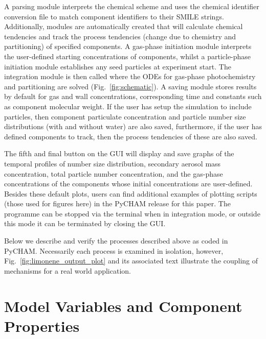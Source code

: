 \documentclass[gmd, manuscript]{copernicus}
\begin{document}
A parsing module interprets the chemical scheme and uses the chemical identifier conversion file to match component identifiers to their SMILE strings.  Additionally, modules are automatically created that will calculate chemical tendencies and track the process tendencies (change due to chemistry and partitioning) of specified components.  A gas-phase initiation module interprets the user-defined starting concentrations of components, whilst a particle-phase initiation module establishes any seed particles at experiment start.  The integration module is then called where the ODEs for gas-phase photochemistry and partitioning are solved (Fig.~\ref{fig:schematic}).  A saving module stores results by default for gas and wall concentrations, corresponding time and constants such as component molecular weight.  If the user has setup the simulation to include particles, then component particulate concentration and particle number size distributions (with and without water) are also saved, furthermore, if the user has defined components to track, then the process tendencies of these are also saved.    

The fifth and final button on the GUI will display and save graphs of the temporal profiles of number size distribution, secondary aerosol mass concentration, total particle number concentration, and the gas-phase concentrations of the components whose initial concentrations are user-defined.  Besides these default plots, users can find additional examples of plotting scripts (those used for figures here) in the PyCHAM release for this paper.  The programme can be stopped via the terminal when in integration mode, or outside this mode it can be terminated by closing the GUI.

Below we describe and verify the processes described above as coded in PyCHAM.  Necessarily each process is examined in isolation, however, Fig.~\ref{fig:limonene_output_plot} and its associated text illustrate the coupling of mechanisms for a real world application.


\section{Model Variables and Component Properties}\label{sec:prop}
\end{document}
